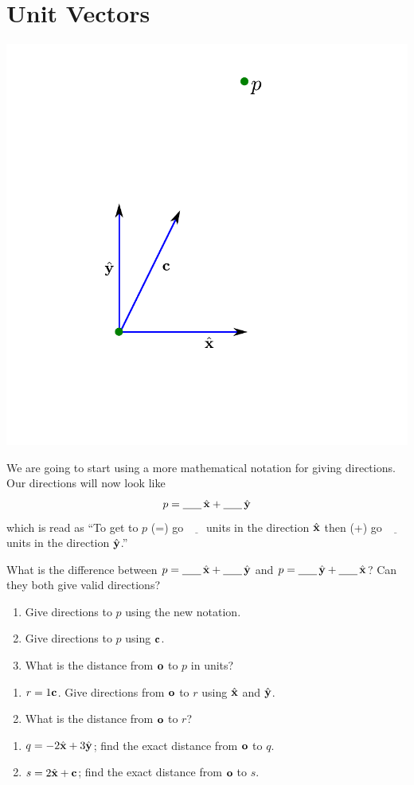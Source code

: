 \documentclass[letter]{article}
\newcommand{\ul}{$\underline{\phantom{xxx}}$}
\newcommand{\ull}{\underline{\phantom{xxx}}}
\newcommand{\xh}{\hat{\bf x}}
\newcommand{\yh}{\hat{\bf y}}
\begin{document}
\section*{Unit Vectors}
	\includegraphics{images/vectors-graphically-2.pdf}

	We are going to start using a more mathematical notation
	for giving directions.  Our directions will now look like
	\[
		p = \ull\, \xh + \ull\, \yh
	\]
	which is read as ``To get to $p$ (=) go \ul units in the direction $\xh$ then (+) go \ul units in 
	the direction $\yh$.''

	\begin{Enum}
		\item What is the difference between $p = \ull\, \xh + \ull\, \yh$ and $p = \ull\, \yh + \ull\, \xh$?
		Can they both give valid directions?
		\item
		\begin{enumerate}
			\item Give directions to $p$ using the new notation. 
			\item Give directions to $p$ using $\bf c$.
			\item What is the distance from $\bf o$ to $p$ in units?
		\end{enumerate}
		\item
		\begin{enumerate}
			\item $r=1\bf c$.  Give directions from $\bf o$ to $r$ using $\xh$ and $\yh$.
			\item What is the distance from $\bf o$ to $r$?
		\end{enumerate}
		\item
		\begin{enumerate}
			\item $q=-2\xh+3\yh$; find the exact distance from $\bf o$ to $q$.
			\item $s=2\xh+\bf c$; find the exact distance from $\bf o$ to $s$.
		\end{enumerate}
	\end{Enum}
\end{document}

